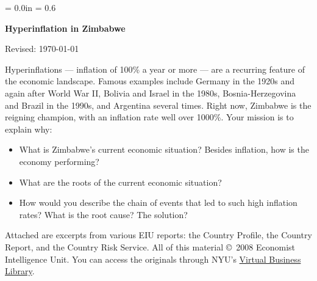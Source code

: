 \documentclass[letterpaper,12pt]{article}
\def\HeadName{Hyperinflation in Zimbabwe}
\begin{document}
\parindent = 0.0in
\parskip = 0.6\bigskipamount
\thispagestyle{empty}%
\Head

\centerline{\large \bf \HeadName}%
\centerline{Revised:  \today}

\bigskip 
Hyperinflations --- inflation of 100\% a year or more --- 
are a recurring feature of the economic landscape.
Famous examples include Germany in the 1920s and again after World War II, 
Bolivia and Israel in the 1980s, 
Bosnia-Herzegovina and Brazil in the 1990s, 
and Argentina several times.
Right now, Zimbabwe is the reigning champion, 
with an inflation rate well over 1000\%.  
Your mission is to explain why:  
%
\begin{itemize}
\item What is Zimbabwe's current economic situation?
Besides inflation, how is the economy performing?  
\item What are the roots of the current economic situation?
\item How would you describe the chain of events that led 
to such high inflation rates?  
What is the root cause?  The solution?  
\end{itemize}

Attached are excerpts from various EIU reports:
the Country Profile, the Country Report, and the Country Risk Service.
All of this material \copyright \ 2008 Economist Intelligence Unit. 
You can access the originals through NYU's 
\href{http://library.nyu.edu/vbl/}
{Virtual Business Library}.


\end{document}
